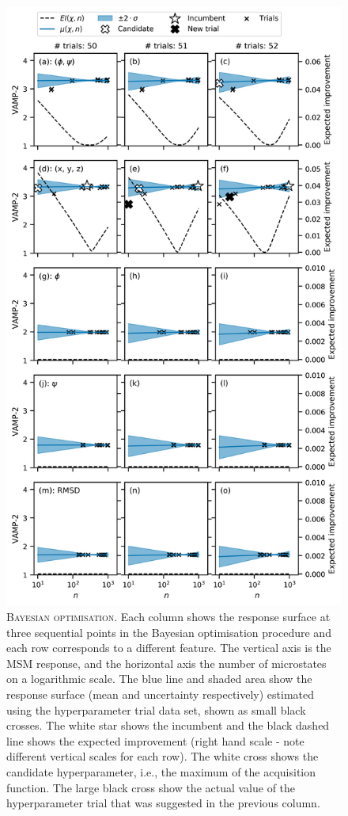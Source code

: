 \begin{figure}[p]
    \centering
    \includegraphics[height=0.75\textheight]{chapters/msm_optimization/figures/ala1_opt_explainer.png}
    \caption[Bayesian optimisation]{\textsc{Bayesian optimisation}. Each column shows the response surface at three sequential points in the Bayesian optimisation procedure and each row corresponds to a different feature. The vertical axis is the MSM response, and the horizontal axis the number of microstates on a logarithmic scale. The blue line and shaded area show the response surface (mean and uncertainty respectively) estimated using the hyperparameter trial data set, shown as small black crosses. The white star shows the incumbent and the black dashed line shows the expected improvement (right hand scale - note different vertical scales for each row). The white cross shows the candidate hyperparameter, i.e., the maximum of the acquisition function. The large black cross show the actual value of the hyperparameter trial that was suggested in the previous column.}
    \label{fig:msm_opt_explainer}
\end{figure}

